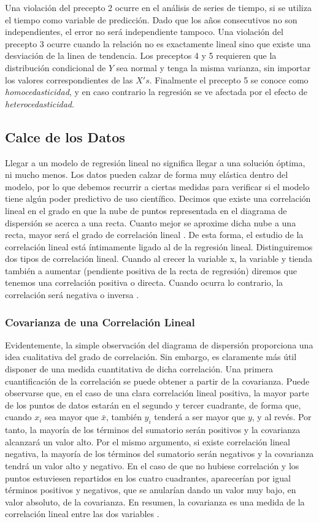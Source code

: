 Una violación del precepto 2 ocurre en el análisis de series de tiempo, si se utiliza el tiempo como variable de predicción. Dado que los años consecutivos no son independientes, el error no será independiente tampoco. Una violación del precepto 3 ocurre cuando la relación no es exactamente lineal sino que existe una desviación de la linea de tendencia. Los preceptos 4 y 5 requieren que la distribución condicional de $Y$ sea normal y tenga la misma varianza, sin importar los valores correspondientes de las $X's$. Finalmente el precepto 5 se conoce como \emph{homocedasticidad}, y en caso contrario la regresión se ve afectada por el efecto de \emph{heterocedasticidad}.

\subsection{Calce de los Datos}
Llegar a un modelo de regresión lineal no significa llegar a una solución óptima, ni mucho menos. Los datos pueden calzar de forma muy elástica dentro del modelo, por lo que debemos recurrir a ciertas medidas para verificar si el modelo tiene algún poder predictivo de uso científico. Decimos que existe una correlación lineal en el grado en que la nube de puntos representada en el diagrama de dispersión se acerca a una recta. Cuanto mejor se aproxime dicha nube a una recta, mayor será el grado de correlación lineal \cite{estadisticaBasica}. De esta forma, el estudio de la correlación lineal está íntimamente ligado al de la regresión lineal. Distinguiremos dos tipos de correlación lineal. Cuando al crecer la variable x, la variable y tienda también a aumentar (pendiente positiva de la recta de regresión) diremos que tenemos una correlación positiva o directa. Cuando ocurra lo contrario, la correlación será negativa o inversa \cite{estadisticaBasica}.

\subsubsection{Covarianza de una Correlación Lineal}
Evidentemente, la simple observación del diagrama de dispersión proporciona una idea cualitativa del grado de correlación. Sin embargo, es claramente más útil disponer de una medida cuantitativa de dicha correlación. Una primera cuantificación de la correlación se puede obtener a partir de la covarianza. Puede observarse que, en el caso de una clara correlación lineal positiva, la mayor parte de los puntos de datos estarán en el segundo y tercer cuadrante, de forma que, cuando $x_i$ sea mayor que $\bar{x}$, también $y_i$ tenderá a ser mayor que $y$, y al revés. Por tanto, la mayoría de los términos del sumatorio serán positivos y la covarianza alcanzará un valor alto. Por el mismo argumento, si existe correlación lineal negativa, la mayoría de los términos del sumatorio serán negativos y la covarianza tendrá un valor alto y negativo. En el caso de que no hubiese correlación y los puntos estuviesen repartidos en los cuatro cuadrantes, aparecerían por igual términos positivos y negativos, que se anularían dando un valor muy bajo, en valor absoluto, de la covarianza. En resumen, la covarianza es una medida de la correlación lineal entre las dos variables \cite{estadisticaBasica}.

